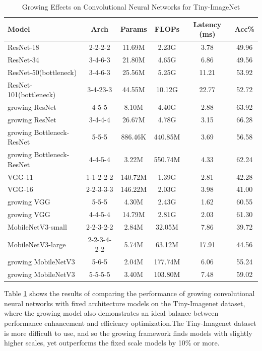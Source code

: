 \documentclass[preprint,12pt]{elsarticle}
\begin{document}
\begin{table}[ht]
\centering
\tiny
\renewcommand{\arraystretch}{1.3}
\begin{adjustbox}{center}
\begin{tabular}{lccccc}
\hline
\textbf{Model} & \textbf{Arch} & \textbf{Params} & \textbf{FLOPs} & \textbf{Latency (ms)} & \textbf{Acc\%} \\
\hline
ResNet-18 & 2-2-2-2 & 11.69M & 2.23G & 3.78 & 49.96 \\
ResNet-34 & 3-4-6-3 & 21.80M & 4.65G & 6.86 & 49.56 \\
ResNet-50(bottleneck) & 3-4-6-3 & 25.56M & 5.25G & 11.21 & 53.92 \\
ResNet-101(bottleneck) & 3-4-23-3 & 44.55M & 10.12G & 22.77 & 52.72 \\
growing ResNet & 4-5-5 & 8.10M & 4.40G & 2.88 & 63.92 \\
growing ResNet & 3-4-4-4 & 26.67M & 4.78G & 3.15 & 66.28 \\
growing Bottleneck-ResNet & 5-5-5 & 886.46K & 440.85M & 3.69 & 56.58 \\
growing Bottleneck-ResNet & 4-4-5-4 & 3.22M & 550.74M & 4.33 & 62.24 \\ \hline
VGG-11 & 1-1-2-2-2 & 140.72M & 1.39G & 2.81 & 42.28 \\
VGG-16 & 2-2-3-3-3 & 146.22M & 2.03G & 3.98 & 41.00 \\
growing VGG & 5-5-5 & 4.30M & 2.43G & 1.62 & 60.55 \\
growing VGG & 4-4-5-4 & 14.79M & 2.81G & 2.03 & 61.30 \\ \hline
MobileNetV3-small & 2-2-3-2-2 & 2.84M & 32.05M & 7.86 & 39.72 \\
MobileNetV3-large & 2-2-3-4-2-2 & 5.74M & 63.12M & 17.91 & 44.56 \\
growing MobileNetV3 & 5-6-5 & 2.04M & 177.74M & 6.06 & 55.24 \\
growing MobileNetV3 & 5-5-5-5 & 3.40M & 103.80M & 7.48 & 59.02 \\
\hline
\end{tabular}
\end{adjustbox}
\caption{Growing Effects on Convolutional Neural Networks for Tiny-ImageNet}
\label{table:tinyimagenet_self_growth}
\end{table}

Table \ref{table:tinyimagenet_self_growth} shows the results of comparing the performance of growing convolutional neural networks with fixed architecture models on the Tiny-Imagenet dataset, where the growing model also demonstrates an ideal balance between performance enhancement and efficiency optimization.The Tiny-Imagenet dataset is more difficult to use, and so the growing framework finds models with slightly higher scales, yet outperforms the fixed scale models by 10\% or more.
\end{document}
